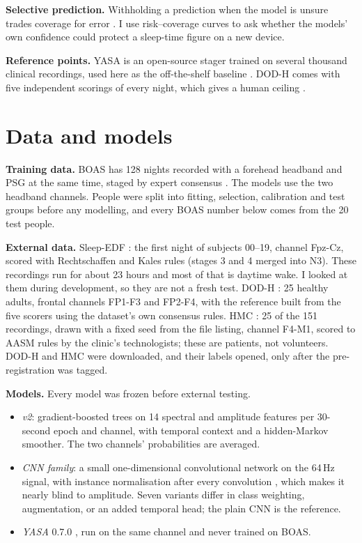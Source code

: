 \documentclass[10pt,twocolumn]{article}
\begin{document}
\textbf{Selective prediction.} Withholding a prediction when the model is unsure trades coverage for
error \cite{geifman2017}. I use risk--coverage curves to ask whether the models' own confidence could
protect a sleep-time figure on a new device.

\textbf{Reference points.} YASA is an open-source stager trained on several thousand clinical
recordings, used here as the off-the-shelf baseline \cite{yasa}. DOD-H comes with five independent
scorings of every night, which gives a human ceiling \cite{dod}.

\section{Data and models}

\textbf{Training data.} BOAS has 128 nights recorded with a forehead headband and PSG at the same
time, staged by expert consensus \cite{boas}. The models use the two headband channels. People were
split into fitting, selection, calibration and test groups before any modelling, and every BOAS
number below comes from the 20 test people.

\textbf{External data.} Sleep-EDF \cite{kemp2000}: the first night of subjects 00--19, channel
Fpz-Cz, scored with Rechtschaffen and Kales rules (stages 3 and 4 merged into N3). These recordings
run for about 23 hours and most of that is daytime wake. I looked at them during development, so they
are not a fresh test. DOD-H \cite{dod}: 25 healthy adults, frontal channels FP1-F3 and FP2-F4, with
the reference built from the five scorers using the dataset's own consensus rules. HMC \cite{hmc}: 25
of the 151 recordings, drawn with a fixed seed from the file listing, channel F4-M1, scored to AASM
rules by the clinic's technologists; these are patients, not volunteers. DOD-H and HMC were downloaded,
and their labels opened, only after the pre-registration was tagged.

\textbf{Models.} Every model was frozen before external testing.
\begin{itemize}
\item \emph{v2}: gradient-boosted trees on 14 spectral and amplitude features per 30-second epoch and
channel, with temporal context and a hidden-Markov smoother. The two channels' probabilities are
averaged.
\item \emph{CNN family}: a small one-dimensional convolutional network on the 64\,Hz signal, with
instance normalisation after every convolution \cite{ulyanov2016}, which makes it nearly blind to
amplitude. Seven variants differ in class weighting, augmentation, or an added temporal head; the
plain CNN is the reference.
\item \emph{YASA} 0.7.0 \cite{yasa}, run on the same channel and never trained on BOAS.
\end{itemize}
\end{document}

